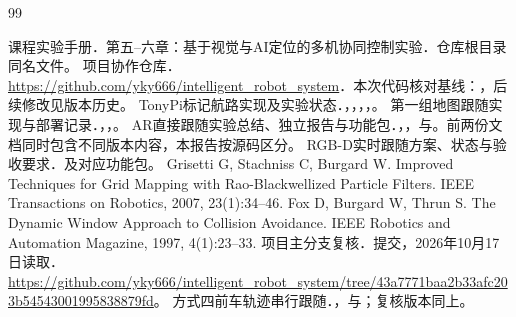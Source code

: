 \begin{thebibliography}{99}
 课程实验手册．第五--六章：基于视觉与AI定位的多机协同控制实验．仓库根目录同名文件。
 项目协作仓库．\url{https://github.com/yky666/intelligent_robot_system}．本次代码核对基线：，后续修改见版本历史。
 TonyPi标记航路实现及实验状态．，，，，。
 第一组地图跟随实现与部署记录．，，。
 AR直接跟随实验总结、独立报告与功能包．，，与。前两份文档同时包含不同版本内容，本报告按源码区分。
 RGB-D实时跟随方案、状态与验收要求．及对应功能包。
 Grisetti G, Stachniss C, Burgard W. Improved Techniques for Grid Mapping with Rao-Blackwellized Particle Filters. IEEE Transactions on Robotics, 2007, 23(1):34--46.
 Fox D, Burgard W, Thrun S. The Dynamic Window Approach to Collision Avoidance. IEEE Robotics and Automation Magazine, 1997, 4(1):23--33.
 项目主分支复核．提交，2026年10月17日读取．\url{https://github.com/yky666/intelligent_robot_system/tree/43a7771baa2b33afc203b54543001995838879fd}。
 方式四前车轨迹串行跟随．，与；复核版本同上。
\end{thebibliography}
